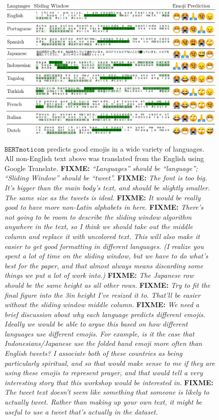 \documentclass[11pt]{article}
\newcommand{\fixme}[1]{{\color{red} \textbf{FIXME:} {\textit {#1}}}}
\newcommand{\bertmoji}{\texttt{BERTmoticon}}
\begin{document}
\begin{figure}
    \centering
    \includegraphics[height=3in]{images/languages_slide_fix.pdf}
    \caption{
        $\bertmoji$ predicts good emojis in a wide variety of languages.
        All non-English text above was translated from the English using Google Translate.
        \fixme{
            ``Languages'' should be ``language''; ``Sliding Window'' should be ``tweet''.
        }
        \fixme{
            The font is too big.  It's bigger than the main body's text, and should be slightly smaller.  The same size as the tweets is ideal.
        }
        \fixme{
            It would be really good to have more non-Latin alphabets in here.
        }
        \fixme{
            There's not going to be room to describe the sliding window algorithm anywhere in the text,
            so I think we should take out the middle column and replace it with uncolored text.
            This will also make it easier to get good formatting in different languages.
            (I realize you spent a lot of time on the sliding window,
            but we have to do what's best for the paper,
            and that almost always means discarding some things we put a lot of work into.)
        }
        \fixme{
            The Japanese row should be the same height as all other rows.
        }
        \fixme{
            Try to fit the final figure into the 3in height I've resized it to.
            That'll be easier without the sliding window middle column.
        }
        \fixme{
            We need a brief discussion about why each language predicts different emojis.
            Ideally we would be able to argue this based on how different languages use different emojis.
            For example, is it the case that Indonesians/Japanese use the folded hand emoji more often than English tweets?
            I associate both of these countries as being particularly spiritual, and so that would make sense to me if they are using these emojis to represent prayer,
            and that would tell a very interesting story that this workshop would be interested in.
        }
        \fixme{
            The tweet text doesn't seem like something that someone is likely to actually tweet.  Rather than making up your own text, it might be useful to use a tweet that's actually in the dataset.
        }
     }
    \label{fig:prediction_top10_langs}
\end{figure}
\end{document}
